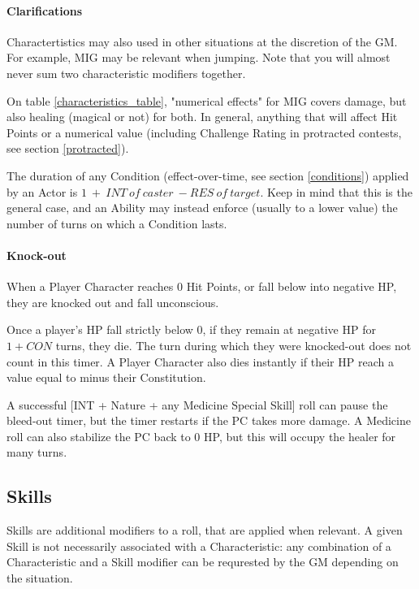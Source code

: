 \paragraph{Clarifications}

Charactertistics may also used in other situations at the discretion of the GM. For example, MIG may be relevant when jumping. Note that you will almost never sum two characteristic modifiers together.

On table \ref{characteristics_table}, "numerical effects" for MIG covers damage, but also healing (magical or not) for both. In general, anything that will affect Hit Points or a numerical value (including Challenge Rating in protracted contests, see section \ref{protracted}).

The duration of any Condition (effect-over-time, see section \ref{conditions}) applied by an Actor is $1 \ + \ INT \ of \ caster \ - RES \ of \ target$. Keep in mind that this is the general case, and an Ability may instead enforce (usually to a lower value) the number of turns on which a Condition lasts.


\paragraph{Knock-out} 

\label{knockout}

When a Player Character reaches 0 Hit Points, or fall below into negative HP, they are knocked out and fall unconscious. 

Once a player's HP fall strictly below 0, if they remain at negative HP for $1+CON$ turns, they die. The turn during which they were knocked-out does not count in this timer. A Player Character also dies instantly if their HP reach a value equal to minus their Constitution.

A successful [INT + Nature + any Medicine Special Skill] roll can pause the bleed-out timer, but the timer restarts if the PC takes more damage. A Medicine roll can also stabilize the PC back to 0 HP, but this will occupy the healer for many turns.


\subsection{Skills}
\label{skills}

Skills are additional modifiers to a roll, that are applied when relevant. A given Skill is not necessarily associated with a Characteristic: any combination of a Characteristic and a Skill modifier can be requrested by the GM depending on the situation.

